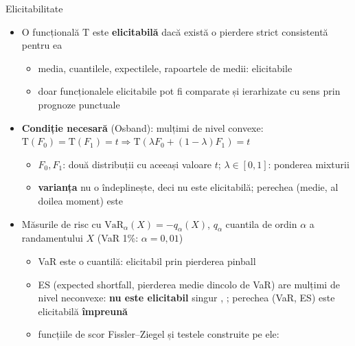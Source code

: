 \begin{frame}{Elicitabilitate}
\itemsize{\small}
\begin{itemize}
    \item O funcțională $\mathrm T$ este \textbf{elicitabilă} dacă există o pierdere strict consistentă pentru ea 
    \begin{itemize}
        \item media, cuantilele, expectilele, rapoartele de medii: elicitabile
        \item doar funcționalele elicitabile pot fi comparate și ierarhizate cu sens prin prognoze punctuale
    \end{itemize}
    \item \textbf{Condiție necesară} (Osband): mulțimi de nivel convexe: $\mathrm T(F_0) = \mathrm T(F_1) = t \Rightarrow \mathrm T(\lambda F_0 + (1 - \lambda)F_1) = t$
    \begin{itemize}
        \item $F_0, F_1$: două distribuții cu aceeași valoare $t$; $\lambda \in [0,1]$: ponderea mixturii
        \item \textbf{varianța} nu o îndeplinește, deci nu este elicitabilă; perechea (medie, al doilea moment) este
    \end{itemize}
    \item Măsurile de risc cu $\mathrm{VaR}_\alpha(X) = -q_\alpha(X)$, $q_\alpha$ cuantila de ordin $\alpha$ a randamentului $X$ (VaR 1\%: $\alpha = 0{,}01$)
    \begin{itemize}
        \item VaR este o cuantilă: elicitabil prin pierderea pinball
        \item ES (expected shortfall, pierderea medie dincolo de VaR) are mulțimi de nivel neconvexe: \textbf{nu este elicitabil} singur , ; perechea (VaR, ES) este elicitabilă \textbf{împreună} 
        \item funcțiile de scor Fissler--Ziegel și testele construite pe ele: 
    \end{itemize}
\end{itemize}
\end{frame}

